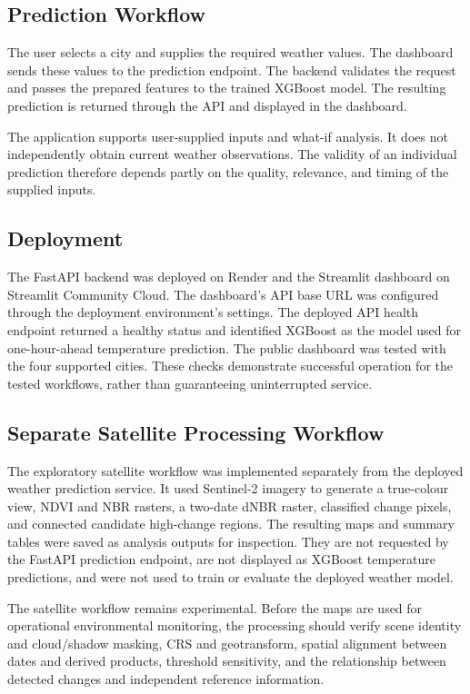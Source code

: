 \documentclass[12pt,a4paper]{article}
\begin{document}
	\subsection{Prediction Workflow}
	
	The user selects a city and supplies the required weather values.
	The dashboard sends these values to the prediction endpoint. The
	backend validates the request and passes the prepared features to
	the trained XGBoost model. The resulting prediction is returned
	through the API and displayed in the dashboard.
	
	The application supports user-supplied inputs and what-if analysis.
	It does not independently obtain current weather observations.
	The validity of an individual prediction therefore depends partly
	on the quality, relevance, and timing of the supplied inputs.
	
	\subsection{Deployment}
	
	The FastAPI backend was deployed on Render and the Streamlit
	dashboard on Streamlit Community Cloud. The dashboard's API base
	URL was configured through the deployment environment's settings.
	The deployed API health endpoint returned a healthy status and
	identified XGBoost as the model used for one-hour-ahead temperature
	prediction. The public dashboard was tested with the four supported
	cities. These checks demonstrate successful operation for the
	tested workflows, rather than guaranteeing uninterrupted service.
	
	\subsection{Separate Satellite Processing Workflow}
	
	The exploratory satellite workflow was implemented separately from
	the deployed weather prediction service. It used Sentinel-2 imagery
	to generate a true-colour view, NDVI and NBR rasters, a two-date dNBR
	raster, classified change pixels, and connected candidate high-change
	regions. The resulting maps and summary tables were saved as analysis
	outputs for inspection. They are not requested by the FastAPI
	prediction endpoint, are not displayed as XGBoost temperature
	predictions, and were not used to train or evaluate the deployed
	weather model.
	
	The satellite workflow remains experimental. Before the maps are used
	for operational environmental monitoring, the processing should
	verify scene identity and cloud/shadow masking, CRS and geotransform,
	spatial alignment between dates and derived products, threshold
	sensitivity, and the relationship between detected changes and
	independent reference information.
	
\end{document}
